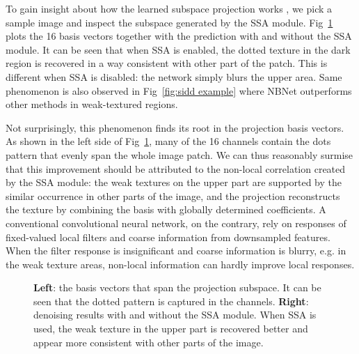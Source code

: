 \documentclass[final]{cvpr}
\begin{document}
To gain insight about how the learned subspace projection works , we pick a sample image and inspect the subspace generated by the SSA module. Fig~\ref{fig:basis vector visual} plots the 16 basis vectors together with the prediction with and without the SSA module. 
It can be seen that when SSA is enabled, the dotted texture in the dark region is recovered in a way consistent with other part of the patch. This is different when SSA is disabled: the network simply blurs the upper area. Same phenomenon is also observed
in Fig~\ref{fig:sidd example} where NBNet outperforms other methods in weak-textured regions.

Not surprisingly, this phenomenon finds its root in the projection basis vectors. 
As shown in the left side of Fig~\ref{fig:basis vector visual}, many of the 16 channels contain the dots  pattern that evenly span the whole image patch. 
We can thus reasonably surmise that this 
improvement should be attributed to the non-local correlation created by the 
SSA module: the weak textures on the upper part are supported by 
the similar occurrence in other parts of the image, and the projection reconstructs
the texture by combining the basis with globally determined coefficients.
A conventional convolutional neural network, on the contrary, rely on responses
of fixed-valued local filters and coarse information from downsampled features. 
When the filter response is insignificant and coarse information is blurry, 
e.g. in the weak texture areas, non-local information can hardly improve local responses.  
\begin{figure}[t]
   \begin{center}
   \end{center}
\caption{\small {\textbf{Left}: the basis vectors that span the projection subspace. It can be seen that the dotted pattern is captured in the channels. \textbf{Right}: denoising results with and without the SSA module. When SSA is used, the weak texture in the upper part is recovered better and appear more consistent with other parts of the image.
   } }
   \label{fig:basis vector visual}
   
\end{figure} 
\end{document}
